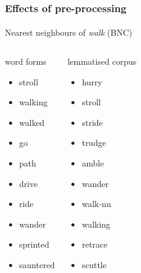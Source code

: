 \begin{frame}
  \frametitle{Effects of pre-processing}
  \framesubtitle{}

  \centering
  Nearest neighbours of \emph{walk} (BNC)
  \footnotesize
  \begin{columns}[t]
    \column{4cm}
    \begin{block}{word forms}
      \begin{itemize}
      \item stroll
      \item walking
      \item walked
      \item go
      \item path
      \item drive
      \item ride
      \item wander
      \item sprinted
      \item sauntered
      \end{itemize}
    \end{block}
    \column{4cm}
    \begin{block}{lemmatised corpus}
      \begin{itemize}
      \item hurry
      \item stroll
      \item stride
      \item trudge
      \item amble
      \item wander
      \item walk-nn
      \item walking
      \item retrace
      \item scuttle 
      \end{itemize}
    \end{block}
  \end{columns}
\end{frame}

